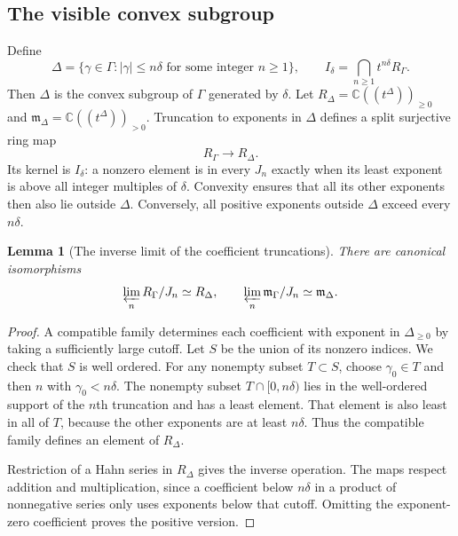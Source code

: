 \documentclass[11pt,letterpaper]{article}
\numberwithin{equation}{section}
\newtheorem{lemma}[theorem]{Lemma}
\theoremstyle{definition}
\theoremstyle{remark}
\newcommand{\C}{\mathbb C}
\newcommand{\mm}{\mathfrak m}
\newcommand{\rg}{R_\Gamma}
\newcommand{\mg}{\mm_\Gamma}
\begin{document}
\subsection{The visible convex subgroup}
Define
\begin{equation}
 \Delta=\{\gamma\in\Gamma:|\gamma|\le n\delta
                         \text{ for some integer }n\ge1\},
 \qquad I_\delta=\bigcap_{n\ge1}t^{n\delta}\rg.
 \label{eq:DeltaI}
\end{equation}
Then $\Delta$ is the convex subgroup of $\Gamma$ generated by
$\delta$. Let $R_\Delta=\C((t^\Delta))_{\ge0}$ and
$\mm_\Delta=\C((t^\Delta))_{>0}$. Truncation to exponents in $\Delta$
defines a split surjective ring map
\begin{equation}
 \rg\longrightarrow R_\Delta.
 \label{eq:convexcut}
\end{equation}
Its kernel is $I_\delta$: a nonzero element is in every $J_n$ exactly
when its least exponent is above all integer multiples of $\delta$.
Convexity ensures that all its other exponents then also lie outside
$\Delta$. Conversely, all positive exponents outside $\Delta$ exceed
every $n\delta$.

\begin{lemma}[The inverse limit of the coefficient truncations]
\label{lem:coefficientlimit}
There are canonical isomorphisms
\begin{equation}
 \varprojlim_n\rg/J_n\simeq R_\Delta,
 \qquad
 \varprojlim_n\mg/J_n\simeq\mm_\Delta.
 \label{eq:coefficientlimit}
\end{equation}
\end{lemma}
\begin{proof}
A compatible family determines each coefficient with exponent in
$\Delta_{\ge0}$ by taking a sufficiently large cutoff. Let $S$ be the
union of its nonzero indices. We check that $S$ is well ordered.
For any nonempty subset $T\subset S$, choose $\gamma_0\in T$ and then
$n$ with $\gamma_0<n\delta$. The nonempty subset
$T\cap[0,n\delta)$ lies in the well-ordered support of the $n$th
truncation and has a least element. That element is also least in all
of $T$, because the other exponents are at least $n\delta$.
Thus the compatible family defines an element of $R_\Delta$.

Restriction of a Hahn series in $R_\Delta$ gives the inverse operation.
The maps respect addition and multiplication, since a coefficient
below $n\delta$ in a product of nonnegative series only uses exponents
below that cutoff. Omitting the exponent-zero coefficient proves the
positive version.
\end{proof}
\end{document}
